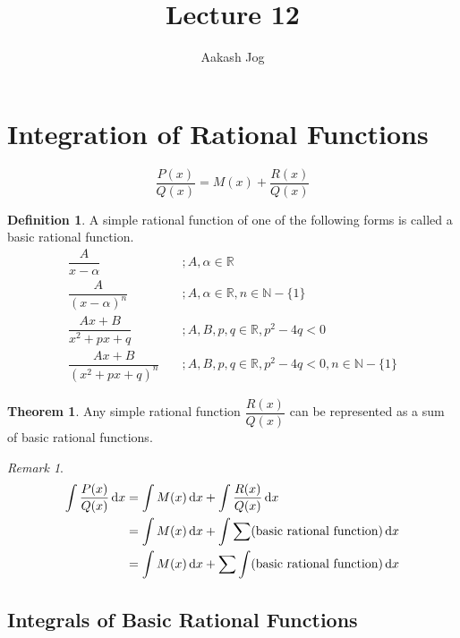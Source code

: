 \documentclass[fleqn]{article}
\title{Lecture 12}
\author{Aakash Jog}
\date{\formatdate{2}{12}{2014}}
\theoremstyle{definition}
\newtheorem{definition}{Definition}
\theoremstyle{theorem}
\newtheorem{theorem}{Theorem}
\theoremstyle{remark}
\newtheorem{remark}{Remark}
\begin{document}
	
\maketitle

\tableofcontents

\newpage

\section{Integration of Rational Functions}

\begin{equation*}
	\dfrac{P(x)}{Q(x)} = M(x) + \dfrac{R(x)}{Q(x)}
\end{equation*}

\begin{definition}
	A simple rational function of one of the following forms is called a basic rational function.
	\begin{align*}
		\dfrac{A}{x - \alpha} &\quad; A, \alpha \in \mathbb{R}\\
		\dfrac{A}{(x - \alpha)^n} &\quad; A, \alpha \in \mathbb{R}, n \in \mathbb{N} - \{1\}\\
		\dfrac{Ax +  B}{x^2 + px + q} &\quad; A, B, p, q \in \mathbb{R}, p^2 - 4q < 0\\
		\dfrac{Ax + B}{(x^2 + px + q)^n} &\quad; A, B, p, q \in \mathbb{R}, p^2 - 4q < 0, n \in \mathbb{N} - \{1\}
	\end{align*}
\end{definition}

\begin{theorem}
	Any simple rational function $\dfrac{R(x)}{Q(x)}$ can be represented as a sum of basic rational functions.
\end{theorem}

\begin{remark}
	\begin{align*}
		\int \dfrac{P(x)}{Q(x)} \dif x &= \int M(x) \dif x + \int \dfrac{R(x)}{Q(x)} \dif x\\
		&= \int M(x) \dif x + \int \sum (\text{basic rational function}) \dif x\\
		&= \int M(x) \dif x + \sum \int (\text{basic rational function}) \dif x
	\end{align*}
\end{remark}

\subsection{Integrals of Basic Rational Functions}
\end{document}
